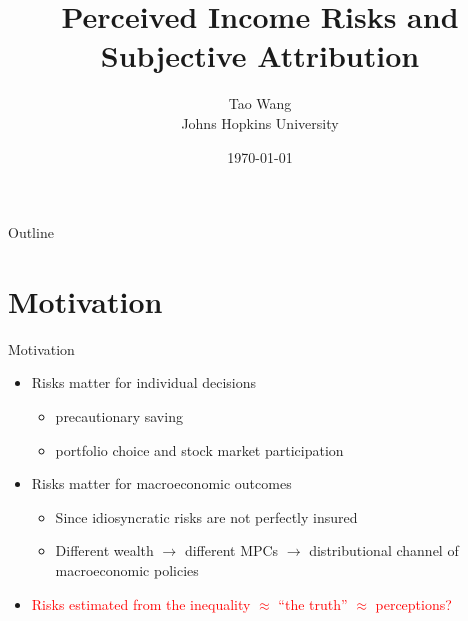 \documentclass{beamer}
\title{Perceived Income Risks and Subjective Attribution}
\author{Tao Wang \\ Johns Hopkins University}
\date{\today}
\begin{document}
	

\begin{frame}
	\titlepage
\end{frame}
\begin{frame}{Outline}
	\tableofcontents
\end{frame}


\section{Motivation}

\begin{frame}{Motivation}
	\begin{itemize}
		\item Risks matter for individual decisions
		\begin{itemize}
			\item precautionary saving
			\item portfolio choice and stock market participation
		\end{itemize} 
		\item Risks matter for macroeconomic outcomes
		\begin{itemize}
			\item Since idiosyncratic risks are not perfectly insured 
			\item Different wealth $\rightarrow$ different MPCs $\rightarrow$ distributional channel of macroeconomic policies 
		\end{itemize}  %
		\item \textcolor{red}{Risks estimated from the inequality $\approx$  ``the truth''  $\approx$ perceptions?} %
	\end{itemize}
\end{frame}
\end{document}
